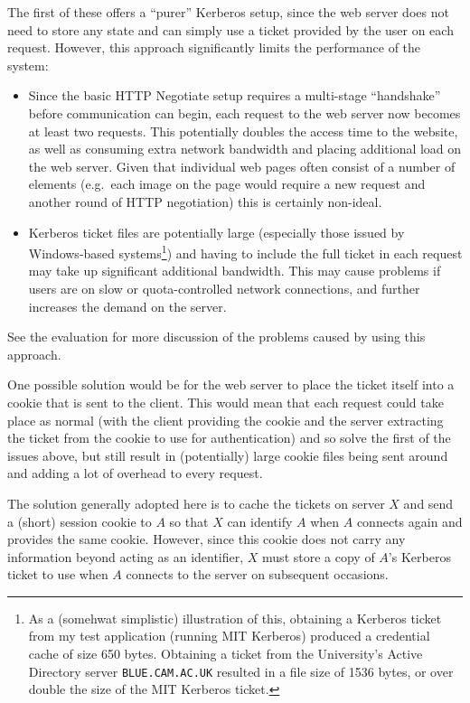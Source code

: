 \documentclass{article}
\begin{document}
The first of these offers a ``purer'' Kerberos setup, since the web server does not need to store any state and can simply use a ticket provided by the user on each request. However, this approach significantly limits the performance of the system:
\begin{itemize}
\item
  Since the basic HTTP Negotiate setup requires a multi-stage ``handshake'' before communication can begin, each request to the web server now becomes at least two requests. This potentially doubles the access time to the website, as well as consuming extra network bandwidth and placing additional load on the web server. Given that individual web pages often consist of a number of elements (e.g.\ each image on the page would require a new request and another round of HTTP negotiation) this is certainly non-ideal.
\item
  Kerberos ticket files are potentially large (especially those issued by Windows-based systems\footnote{As a (somehwat simplistic) illustration of this, obtaining a Kerberos ticket from my test application (running MIT Kerberos) produced a credential cache of size 650 bytes. Obtaining a ticket from the University's Active Directory server \texttt{BLUE.CAM.AC.UK} resulted in a file size of 1536 bytes, or over double the size of the MIT Kerberos ticket.}) and having to include the full ticket in each request may take up significant additional bandwidth. This may cause problems if users are on slow or quota-controlled network connections, and further increases the demand on the server.
\end{itemize}

See the evaluation for more discussion of the problems caused by using this approach.

One possible solution would be for the web server to place the ticket itself into a cookie that is sent to the client. This would mean that each request could take place as normal (with the client providing the cookie and the server extracting the ticket from the cookie to use for authentication) and so solve the first of the issues above, but still result in (potentially) large cookie files being sent around and adding a lot of overhead to every request.

The solution generally adopted here is to cache the tickets on server $X$ and send a (short) session cookie to $A$ so that $X$ can identify $A$ when $A$ connects again and provides the same cookie. However, since this cookie does not carry any information beyond acting as an identifier, $X$ must store a copy of $A$'s Kerberos ticket to use when $A$ connects to the server on subsequent occasions.
\end{document}
